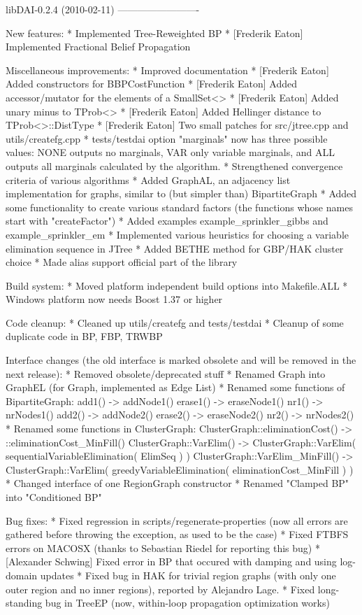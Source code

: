 \begin{DoxyVerbInclude}
libDAI-0.2.4 (2010-02-11)
-------------------------

New features:
* Implemented Tree-Reweighted BP
* [Frederik Eaton] Implemented Fractional Belief Propagation

Miscellaneous improvements:
* Improved documentation
* [Frederik Eaton] Added constructors for BBPCostFunction
* [Frederik Eaton] Added accessor/mutator for the elements of a SmallSet<>
* [Frederik Eaton] Added unary minus to TProb<>
* [Frederik Eaton] Added Hellinger distance to TProb<>::DistType
* [Frederik Eaton] Two small patches for src/jtree.cpp and utils/createfg.cpp
* tests/testdai option "marginals" now has three possible values: NONE
  outputs no marginals, VAR only variable marginals, and ALL outputs all
  marginals calculated by the algorithm.
* Strengthened convergence criteria of various algorithms
* Added GraphAL, an adjacency list implementation for graphs,
  similar to (but simpler than) BipartiteGraph
* Added some functionality to create various standard factors
  (the functions whose names start with "createFactor")
* Added examples example_sprinkler_gibbs and example_sprinkler_em
* Implemented various heuristics for choosing a variable elimination sequence 
  in JTree
* Added BETHE method for GBP/HAK cluster choice
* Made alias support official part of the library

Build system:
* Moved platform independent build options into Makefile.ALL
* Windows platform now needs Boost 1.37 or higher

Code cleanup:
* Cleaned up utils/createfg and tests/testdai
* Cleanup of some duplicate code in BP, FBP, TRWBP

Interface changes (the old interface is marked obsolete and will be removed in the next release):
* Removed obsolete/deprecated stuff
* Renamed Graph into GraphEL (for Graph, implemented as Edge List)
* Renamed some functions of BipartiteGraph:
    add1() -> addNode1()
    erase1() -> eraseNode1()
    nr1() -> nrNodes1()
    add2() -> addNode2()
    erase2() -> eraseNode2()
    nr2() -> nrNodes2()
* Renamed some functions in ClusterGraph:
    ClusterGraph::eliminationCost() -> ::eliminationCost_MinFill() 
    ClusterGraph::VarElim() -> ClusterGraph::VarElim( sequentialVariableElimination( ElimSeq ) ) 
    ClusterGraph::VarElim_MinFill() -> ClusterGraph::VarElim( greedyVariableElimination( eliminationCost_MinFill ) )
* Changed interface of one RegionGraph constructor
* Renamed "Clamped BP" into "Conditioned BP"

Bug fixes:
* Fixed regression in scripts/regenerate-properties (now all errors are 
  gathered before throwing the exception, as used to be the case)
* Fixed FTBFS errors on MACOSX (thanks to Sebastian Riedel for reporting this bug)
* [Alexander Schwing] Fixed error in BP that occured with damping
  and using log-domain updates
* Fixed bug in HAK for trivial region graphs (with only one outer region
  and no inner regions), reported by Alejandro Lage.
* Fixed long-standing bug in TreeEP (now, within-loop propagation optimization works)



\end{DoxyVerbInclude}
